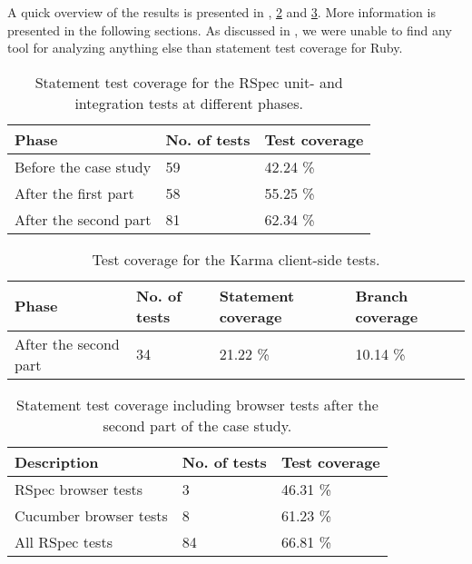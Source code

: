 \label{sec:results_coverage}

A quick overview of the results is presented in
, \ref{tab:client_coverage} and
\ref{tab:browser_coverage}. More information is presented in the
following sections. As discussed in , we
were unable to find any tool for analyzing anything else than statement
test coverage for Ruby.\\

\begin{table}[t]
    \centering
    \begin{tabular}{l l l}
        Phase & No. of tests & Test coverage\\
        \hline
        Before the case study &       59 & 42.24 \%\\
        After the first part  &       58 & 55.25 \%\\
        After the second part &       81 & 62.34 \%\\
    \end{tabular}
    \caption{ Statement test coverage for the RSpec unit- and integration tests at different phases. }
    \label{tab:unit_coverage}
\end{table}

\begin{table}[t]
    \centering
    \begin{tabular}{l l l l}
        Phase & No. of tests & Statement coverage & Branch coverage\\
        \hline
        After the second part & 34 & 21.22 \% & 10.14 \%\\
    \end{tabular}
    \caption{ Test coverage for the Karma client-side tests. }
    \label{tab:client_coverage}
\end{table}

\begin{table}[t]
    \centering
    \begin{tabular}{l l l}
        Description & No. of tests & Test coverage\\
        \hline
        RSpec browser tests &     3 & 46.31 \%\\
        Cucumber browser tests &  8 & 61.23 \%\\
        All RSpec tests &        84 & 66.81 \%\\
    \end{tabular}
    \caption{ Statement test coverage including browser tests after the second part of the case study. }
    \label{tab:browser_coverage}
\end{table}

